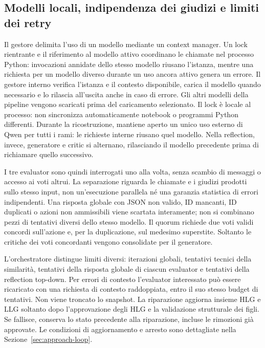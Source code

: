 \subsection{Modelli locali, indipendenza dei giudizi e limiti dei retry}
Il gestore  delimita l'uso di un modello mediante
un context manager. Un lock rientrante e il riferimento al modello attivo
coordinano le chiamate nel processo Python: invocazioni annidate dello stesso
modello riusano l'istanza, mentre una richiesta per un modello diverso durante
un uso ancora attivo genera un errore. Il gestore interno verifica l'istanza
e il contesto disponibile, carica il modello quando necessario e lo rilascia
all'uscita anche in caso di errore. Gli altri modelli della pipeline vengono
scaricati prima del caricamento selezionato. Il lock è locale al processo:
non sincronizza automaticamente notebook o programmi Python differenti.
Durante la ricostruzione,  mantiene aperto
un unico uso esterno di Qwen per tutti i rami: le richieste interne riusano
quel modello. Nella reflection, invece, generatore e critic si alternano,
rilasciando il modello precedente prima di richiamare quello successivo.

I tre evaluator sono quindi interrogati uno alla volta, senza scambio di
messaggi o accesso ai voti altrui. La separazione riguarda le chiamate e i
giudizi prodotti sullo stesso input, non un'esecuzione parallela né una
garanzia statistica di errori indipendenti.
Una risposta globale con JSON non valido, ID mancanti, ID duplicati o azioni
non ammissibili viene scartata interamente; non si combinano pezzi di tentativi
diversi dello stesso modello. Il quorum richiede due voti validi concordi
sull'azione e, per la duplicazione, sul medesimo superstite. Soltanto le
critiche dei voti concordanti vengono consolidate per il generatore.

L'orchestratore distingue limiti diversi: iterazioni globali, tentativi
tecnici della similarità, tentativi della risposta globale di ciascun evaluator
e tentativi della reflection top-down. Per errori di contesto l'evaluator
interessato può essere ricaricato con una richiesta di contesto raddoppiata,
entro il suo stesso budget di tentativi. Non viene troncato lo snapshot.
La riparazione aggiorna insieme HLG e LLG soltanto dopo l'approvazione degli
HLG e la validazione strutturale dei figli. Se fallisce, conserva lo stato
precedente alla riparazione, incluse le rimozioni già approvate. Le condizioni
di aggiornamento e arresto sono dettagliate nella Sezione~\ref{sec:approach-loop}.

